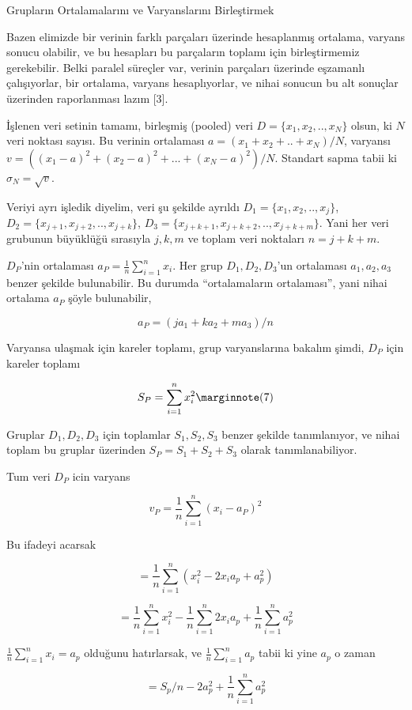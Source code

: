 \documentclass[12pt,fleqn]{article}\usepackage{../../common}
\begin{document}
Grupların Ortalamalarını ve Varyanslarını Birleştirmek

Bazen elimizde bir verinin farklı parçaları üzerinde hesaplanmış ortalama,
varyans sonucu olabilir, ve bu hesapları bu parçaların toplamı için
birleştirmemiz gerekebilir. Belki paralel süreçler var, verinin parçaları
üzerinde eşzamanlı çalışıyorlar, bir ortalama, varyans hesaplıyorlar,
ve nihai sonucun bu alt sonuçlar üzerinden raporlanması lazım [3].

İşlenen veri setinin tamamı, birleşmiş (pooled) veri $D = \{ x_1, x_2,.., x_N\}$ 
olsun, ki $N$ veri noktası sayısı. Bu verinin ortalaması $a = (x_1 + x_2 + .. + x_N) / N$, 
varyansı $v = ((x_1 - a)^2 + (x_2 - a)^2 + ... + (x_N - a)^2 ) / N$.  
Standart sapma tabii ki $\sigma_N = \sqrt{v}$.

Veriyi ayrı işledik diyelim, veri şu şekilde ayrıldı $D_1 = \{ x_1, x_2,..,x_j\}$,
$D_2 = \{ x_{j+1}, x_{j+2},..,x_{j+k}\}$, $D_3 = \{ x_{j+k+1}, x_{j+k+2},..,x_{j+k+m}\}$.
Yani her veri grubunun büyüklüğü sırasıyla $j,k,m$ ve toplam veri noktaları
$n = j+k+m$.

$D_P$'nin ortalaması $a_P = \frac{1}{n} \sum _{i=1}^{n} x_i$. Her grup $D_1,D_2,D_3$'un
ortalaması $a_1,a_2,a_3$ benzer şekilde bulunabilir. Bu durumda ``ortalamaların
ortalaması'', yani nihai ortalama $a_P$ şöyle bulunabilir,

$$
a_P = (j a_1 + k a_2 + m a_3 ) / n
$$

Varyansa ulaşmak için kareler toplamı, grup varyanslarına bakalım şimdi, $D_P$
için kareler toplamı

$$
S_P = \sum _{i=1}^{n} x_i^2
\mlabel{7}
$$

Gruplar $D_1,D_2,D_3$ için toplamlar $S_1,S_2,S_3$ benzer şekilde tanımlanıyor,
ve nihai toplam bu gruplar üzerinden $S_P = S_1 + S_2 + S_3$ olarak
tanımlanabiliyor.

Tum veri $D_P$ icin varyans

$$
v_P = \frac{1}{n} \sum_{i=1}^{n} (x_i - a_P)^2
$$

Bu ifadeyi acarsak

$$
= \frac{1}{n} \sum_{i=1}^{n} ( x_i^2 - 2 x_i a_p + a_p^2 )
$$

$$
= \frac{1}{n} \sum_{i=1}^{n}  x_i^2  - \frac{1}{n} \sum_{i=1}^{n}  2 x_i a_p + \frac{1}{n} \sum_{i=1}^{n} a_p^2
$$

$\frac{1}{n} \sum_{i=1}^{n} x_i = a_p$ olduğunu hatırlarsak, ve $\frac{1}{n} \sum_{i=1}^{n} a_p$
tabii ki yine $a_p$ o zaman 

$$
= S_p / n  - 2 a_p^2 + \frac{1}{n} \sum_{i=1}^{n} a_p^2
$$
\end{document}
